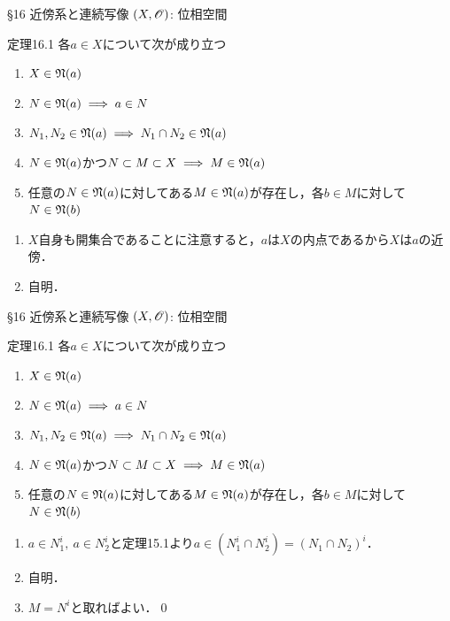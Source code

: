 \documentclass[uplatex,a4paper,dvipdfmx,aspectratio=169,11pt]{beamer}
\begin{document}
\begin{frame}[fragile]{\S 16 近傍系と連続写像}
    $(X, \mathscr{O})$: 位相空間

    \begin{block}{定理16.1}
        各$a \in X$について次が成り立つ
        \begin{enumerate}
            \item $X \in \mathord{\mathfrak{N}}\qty(a)$
            \item[1.5.] $N \in \mathord{\mathfrak{N}}\qty(a) \implies a \in N$
            \item $N_1, N_2 \in \mathord{\mathfrak{N}}\qty(a) \implies N_1 \cap N_2 \in \mathord{\mathfrak{N}}\qty(a)$
            \item $N \in \mathord{\mathfrak{N}}\qty(a)$かつ$N \subset M \subset X \implies M \in \mathord{\mathfrak{N}}\qty(a)$ 
            \item 任意の$N \in \mathord{\mathfrak{N}}\qty(a)$に対してある$M \in \mathord{\mathfrak{N}}\qty(a)$が存在し，各$b \in M$に対して$N \in \mathord{\mathfrak{N}}\qty(b)$
        \end{enumerate}
    \end{block}

    \medskip{}

    \medskip{}
    \begin{enumerate}
        \item $X$自身も開集合であることに注意すると，$a$は$X$の内点であるから$X$は$a$の近傍．
        \item[1.5.] 自明．
    \end{enumerate}
\end{frame}

\begin{frame}[fragile]{\S 16 近傍系と連続写像}
    $(X, \mathscr{O})$: 位相空間

    \begin{block}{定理16.1}
        各$a \in X$について次が成り立つ
        \begin{enumerate}
            \item $X \in \mathord{\mathfrak{N}}\qty(a)$
            \item[1.5.] $N \in \mathord{\mathfrak{N}}\qty(a) \implies a \in N$
            \item $N_1, N_2 \in \mathord{\mathfrak{N}}\qty(a) \implies N_1 \cap N_2 \in \mathord{\mathfrak{N}}\qty(a)$
            \item $N \in \mathord{\mathfrak{N}}\qty(a)$かつ$N \subset M \subset X \implies M \in \mathord{\mathfrak{N}}\qty(a)$ 
            \item 任意の$N \in \mathord{\mathfrak{N}}\qty(a)$に対してある$M \in \mathord{\mathfrak{N}}\qty(a)$が存在し，各$b \in M$に対して$N \in \mathord{\mathfrak{N}}\qty(b)$
        \end{enumerate}
    \end{block}

    \medskip{}

    \begin{enumerate}[2.]
        \item[2.] $a \in N_1^i,\ a \in N_2^i$と定理15.1より$a \in (N_1^i \cap N_2^i) = (N_1 \cap N_2)^i$．
        \item[3.] 自明．
        \item[4.] $M = N^i$と取ればよい．\qed
    \end{enumerate}
\end{frame}
\end{document}
